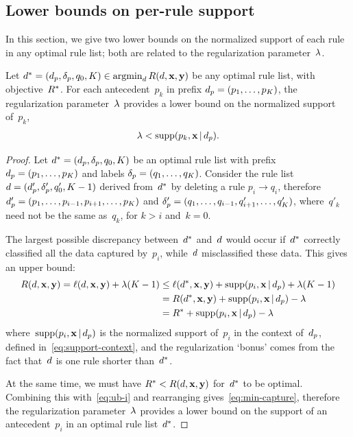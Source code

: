 \subsection{Lower bounds on per-rule support}
\label{sec:lb-support}

In this section, we give two lower bounds on the normalized support
of each rule in any optimal rule list;
both are related to the regularization parameter~${\lambda}$.

\begin{theorem}
\label{thm:min-capture}
Let ${d^* = (d_p, \delta_p, q_0, K) \in \operatorname*{argmin}_{d} R({d}, \mathbf{x}, \mathbf{y})}$
be any optimal rule list, with objective~$R^*$.
%
For each antecedent~$p_k$ in prefix ${d_p = (p_1, \dots, p_K)}$,
the regularization parameter~${\lambda}$ provides a lower bound
on the normalized support of~$p_k$,
\begin{align}
\Reg < \Supp(p_k, \x \given \Prefix).
\label{eq:min-capture}
\end{align}
\end{theorem}

\begin{proof}
Let ${d^* = (d_p, \delta_p, q_0, K)}$ be an optimal
rule list with prefix ${d_p = (p_1, \dots, p_K)}$
and labels ${\delta_p = (q_1, \dots, q_K)}$.
%
Consider the rule list ${{d} =  (d_p', \delta_p', q_0', K-1)}$
derived from~$d^*$ by deleting a rule ${p_i \rightarrow q_i}$,
therefore ${d_p' = (p_1, \dots, p_{i-1}, p_{i+1}, \dots, p_K)}$
and ${\delta_p' = (q_1, \dots, q_{i-1}, q'_{i+1}, \dots, q'_K)}$,
where~$q'_k$ need not be the same as~$q_k$, for ${k > i}$ and~${k = 0}$.

The largest possible discrepancy between~$d^*$ and~${d}$ would occur
if~$d^*$ correctly classified all the data captured by~$p_i$,
while~${d}$ misclassified these data.
%
This gives an upper bound:
\begin{align}
\Obj(\RL, \x, \y) = \Loss(\RL, \x, \y) + \Reg (K - 1)
&\le \Loss(\OptimalRL, \x, \y) + \Supp(p_i, \x \given \Prefix) + \Reg(K - 1) \nn \\
&= \Obj(\OptimalRL, \x, \y) + \Supp(p_i, \x \given \Prefix) - \Reg \nn \\
&= \OptimalObj + \Supp(p_i, \x \given \Prefix) - \Reg
\label{eq:ub-i}
\end{align}
where~$\textnormal{supp}(p_i, \mathbf{x} \,|\, d_p)$ is the normalized support of~$p_i$
in the context of~$d_p$, defined in~\eqref{eq:support-context},
and the regularization `bonus' comes from the fact that~${d}$
is one rule shorter than~$d^*$.

At the same time, we must have ${R^* < R({d}, \mathbf{x}, \mathbf{y})}$ for~$d^*$ to be optimal.
%
Combining this with~\eqref{eq:ub-i} and rearranging gives~\eqref{eq:min-capture},
therefore the regularization parameter~${\lambda}$ provides a lower bound
on the support of an antecedent~$p_i$ in an optimal rule list~$d^*$.
\end{proof}

